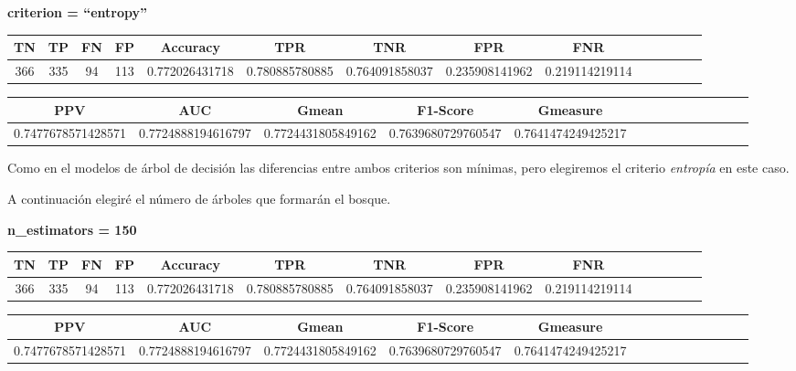 \documentclass[a4]{article}
\begin{document}
\textbf{criterion = ``entropy''}
\begin{center}
\begin{tabular}{|c|c|c|c|c|c|c|c|c|c|c|c|c|c|}
\hline
\multicolumn{1}{|c|}{\textbf{TN}}& \textbf{TP} & \textbf{FN} & \textbf{FP} & \textbf{Accuracy} & \textbf{TPR} & \textbf{TNR} & \textbf{FPR} &\textbf{FNR} \\ \hline
  366 & 335 & 94 & 113 & 0.772026431718 & 0.780885780885 & 0.764091858037 & 0.235908141962 & 0.219114219114 \\ \hline
\end{tabular}
\end{center}

\begin{center}
\begin{tabular}{|c|c|c|c|c|c|c|c|c|c|c|c|c|c|}
\hline
\multicolumn{1}{|c|}{\textbf{PPV}} & \textbf{AUC} & \textbf{Gmean} & \textbf{F1-Score} & \textbf{Gmeasure}  \\ \hline
  0.7477678571428571 & 0.7724888194616797 & 0.7724431805849162 & 0.7639680729760547 & 0.7641474249425217 \\ \hline
\end{tabular}
\end{center}

\vspace{5mm}

Como en el modelos de árbol de decisión las diferencias entre ambos criterios son mínimas, pero elegiremos el criterio \textit{entropía} en este caso.

A continuación elegiré el número de árboles que formarán el bosque. 

\textbf{n\_estimators = 150}
\begin{center}
\begin{tabular}{|c|c|c|c|c|c|c|c|c|c|c|c|c|c|}
\hline
\multicolumn{1}{|c|}{\textbf{TN}}& \textbf{TP} & \textbf{FN} & \textbf{FP} & \textbf{Accuracy} & \textbf{TPR} & \textbf{TNR} & \textbf{FPR} &\textbf{FNR} \\ \hline
  366 & 335 & 94 & 113 & 0.772026431718 & 0.780885780885 & 0.764091858037 & 0.235908141962 & 0.219114219114 \\ \hline
\end{tabular}
\end{center}

\begin{center}
\begin{tabular}{|c|c|c|c|c|c|c|c|c|c|c|c|c|c|}
\hline
\multicolumn{1}{|c|}{\textbf{PPV}} & \textbf{AUC} & \textbf{Gmean} & \textbf{F1-Score} & \textbf{Gmeasure}  \\ \hline
  0.7477678571428571 & 0.7724888194616797 & 0.7724431805849162 & 0.7639680729760547 & 0.7641474249425217 \\ \hline
\end{tabular}
\end{center}
\end{document}
